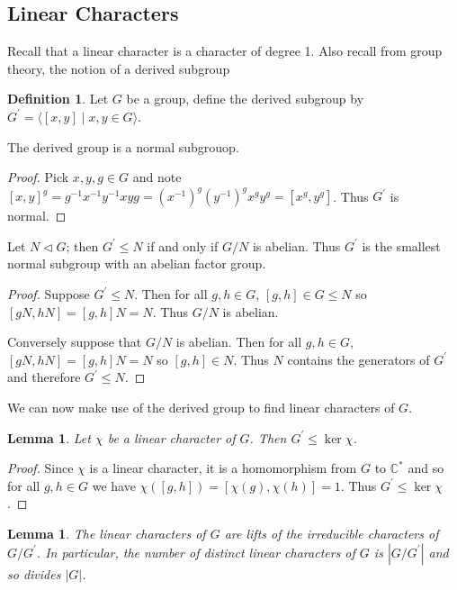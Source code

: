 \documentclass[11pt, notitlepage]{article}
\numberwithin{equation}{section}
\theoremstyle{plain}
\newtheorem{lemma}[theorem]{Lemma}
\theoremstyle{definition}
\newtheorem{definition}[theorem]{Definition}
\newenvironment{remark}
	{\pushQED{\qed}\renewcommand{\qedsymbol}{$\blacklozenge$}\remarkx}
	{\popQED\endremarkx}
\begin{document}
\subsection{Linear Characters}

Recall that a linear character is a character of degree 1. Also recall from group theory, the notion of a derived subgroup

\begin{definition}
Let $G$ be a group, define the derived subgroup by $G^\prime = \langle [x,y] \mid x,y\in G\rangle$.
\end{definition}

\begin{remark}
The derived group is a normal subgrouop.
\end{remark}
\begin{proof}
	Pick $x,y,g\in G$ and note $[x,y]^g = g^{-1}x^{-1}y^{-1}xyg = (x^{-1})^g(y^{-1})^gx^gy^g = [x^g,y^g]$. Thus $G^\prime$ is normal.
\end{proof}

\begin{remark}
Let $N\triangleleft G$; then $G^\prime\leq N$ if and only if $G/N$ is abelian. Thus $G^\prime$ is the smallest normal subgroup with an abelian factor group.
\end{remark}
\begin{proof}
	Suppose $G^\prime\leq N$. Then for all $g,h\in G$, $[g,h]\in G\leq N$ so $[gN, hN] = [g,h]N = N$. Thus $G/N$ is abelian.

	Conversely suppose that $G/N$ is abelian. Then for all $g,h\in G$, $[gN, hN] = [g,h]N = N$ so $[g,h]\in N$. Thus $N$ contains the generators of $G^\prime$ and therefore $G^\prime\leq N$. 
\end{proof}

We can now make use of the derived group to find linear characters of $G$. 

\begin{lemma}
Let $\chi$ be a linear character of $G$. Then $G^\prime \leq \ker\chi$.
\end{lemma}
\begin{proof}
	Since $\chi$ is a linear character, it is a homomorphism from $G$ to $\mathbb{C}^*$ and so for all $g,h\in G$ we have $\chi([g,h]) = [\chi(g), \chi(h)] = 1$. Thus $G^\prime\leq \ker\chi$.
\end{proof}

\begin{lemma}
The linear characters of $G$ are lifts of the irreducible characters of $G/G^\prime$. In particular, the number of distinct linear characters of $G$ is $\left|G/G^\prime\right|$ and so divides $|G|$.
\end{lemma}
\end{document}
